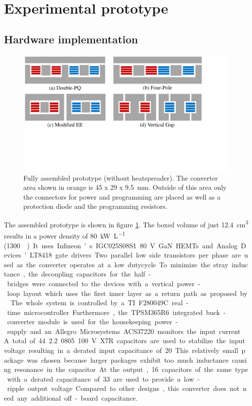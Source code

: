 \documentclass{IPEC2026}
\begin{document}
\section{Experimental prototype}
\subsection{Hardware implementation}
\begin{figure}
  \centering
  \includegraphics[page=4, trim = 0cm 0cm 3cm 0cm, clip, width=\columnwidth]{figures/IPEC_Figures_PowerPoint.pdf}
  \caption{Fully assembled prototype (without heatspreader).  The converter area shown in orange is 45 x 29 x \qty{9.5}{\mm}. Outside of this area only the connectors for power and programming are placed as well as a protection diode and the programming resistors.}
  \label{fig:PrototypePicture}
\end{figure}
The assembled prototype is shown in figure \ref{fig:PrototypePicture}. The boxed volume of just \qty{12.4}{\cubic\cm} results in a power density of \qty{80}{\kW\per\liter} (\qty{1300}{\W\per\cubic\inch}) 
It uses Infineon's IGC025S08S1 \qty{80}{\V} GaN HEMTs and Analog Devices' LT8418 gate drivers. Two parallel low side transistors per phase are used as the converter operates at a low dutycycle. To minimize the stray inductance, the decoupling capacitors for the half-bridges were connected to the devices with a vertical power-loop layout which uses the first inner layer as a return path as proposed by \cite{reuschUnderstandingEffectPCB2014}.
The whole system is controlled by a TI F280049C real-time microcontroller. Furthermore, the TPSM365R6 integrated buck-converter module is used for the housekeeping power-supply and an Allegro Microsystems ACS37220 monitors the input current.
A total of 44 \qty{2.2}{\uF} 0805 \qty{100}{\V} X7R capacitors are used to stabilize the input voltage resulting in a derated input capacitance of \qty{20}{\uF}. This relatively small package was chosen because larger packages exhibit too much inductance causing resonance in the capacitor. At the output, 16 capacitors of the same type with a derated capacitance of \qty{33}{\uF} are used to provide a low-ripple output voltage. Compared to other designs, this converter does not need any additional off-board capacitance.
\end{document}
